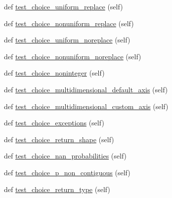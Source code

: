 \begin{DoxyCompactItemize}
\item 
def \hyperlink{classnumpy_1_1random_1_1tests_1_1test__generator__mt19937_1_1TestRandomDist_a76cabfa1a0a991afde39a92a5502d951}{test\+\_\+choice\+\_\+uniform\+\_\+replace} (self)
\item 
def \hyperlink{classnumpy_1_1random_1_1tests_1_1test__generator__mt19937_1_1TestRandomDist_a9e48870e5a998ac82f15489f2dc3a754}{test\+\_\+choice\+\_\+nonuniform\+\_\+replace} (self)
\item 
def \hyperlink{classnumpy_1_1random_1_1tests_1_1test__generator__mt19937_1_1TestRandomDist_af71a46002ec82b77a0f2677971ec4dc6}{test\+\_\+choice\+\_\+uniform\+\_\+noreplace} (self)
\item 
def \hyperlink{classnumpy_1_1random_1_1tests_1_1test__generator__mt19937_1_1TestRandomDist_a9fde3f068b8e5c1499dc5c61361cd026}{test\+\_\+choice\+\_\+nonuniform\+\_\+noreplace} (self)
\item 
def \hyperlink{classnumpy_1_1random_1_1tests_1_1test__generator__mt19937_1_1TestRandomDist_af897a70209c8602739cc3aeb24140c25}{test\+\_\+choice\+\_\+noninteger} (self)
\item 
def \hyperlink{classnumpy_1_1random_1_1tests_1_1test__generator__mt19937_1_1TestRandomDist_a7b5c59b269bfcb1ebd862683f77c066f}{test\+\_\+choice\+\_\+multidimensional\+\_\+default\+\_\+axis} (self)
\item 
def \hyperlink{classnumpy_1_1random_1_1tests_1_1test__generator__mt19937_1_1TestRandomDist_a37b272d9969f123ecffd6bfde4f2094f}{test\+\_\+choice\+\_\+multidimensional\+\_\+custom\+\_\+axis} (self)
\item 
def \hyperlink{classnumpy_1_1random_1_1tests_1_1test__generator__mt19937_1_1TestRandomDist_acbc9d5556ba931ca761fcaece8761bbe}{test\+\_\+choice\+\_\+exceptions} (self)
\item 
def \hyperlink{classnumpy_1_1random_1_1tests_1_1test__generator__mt19937_1_1TestRandomDist_a3a3eec0269e140ca4447cb0008170860}{test\+\_\+choice\+\_\+return\+\_\+shape} (self)
\item 
def \hyperlink{classnumpy_1_1random_1_1tests_1_1test__generator__mt19937_1_1TestRandomDist_a57c5c522563ae8dfbd62538426fb4455}{test\+\_\+choice\+\_\+nan\+\_\+probabilities} (self)
\item 
def \hyperlink{classnumpy_1_1random_1_1tests_1_1test__generator__mt19937_1_1TestRandomDist_a5bd04b0e6c60ea620fa64619060cd3f8}{test\+\_\+choice\+\_\+p\+\_\+non\+\_\+contiguous} (self)
\item 
def \hyperlink{classnumpy_1_1random_1_1tests_1_1test__generator__mt19937_1_1TestRandomDist_ab08dcd31969b6343109f18c975e2b808}{test\+\_\+choice\+\_\+return\+\_\+type} (self)

\end{DoxyCompactItemize}
